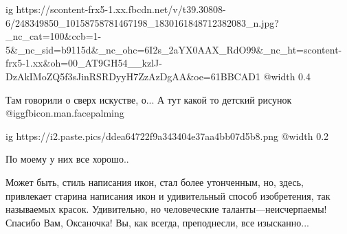  
 
 
 
 

\ifcmt
  ig https://scontent-frx5-1.xx.fbcdn.net/v/t39.30808-6/248349850_10158758781467198_1830161848712382083_n.jpg?_nc_cat=100&ccb=1-5&_nc_sid=b9115d&_nc_ohc=6I2s_2aYX0AAX_RdO99&_nc_ht=scontent-frx5-1.xx&oh=00_AT9GH54__kzlJ-DzAkIMoZQ5f3sJinRSRDyyH7ZzAzDgAA&oe=61BBCAD1
  @width 0.4
\fi


Там говорили о сверх искустве, о... А тут какой то детский рисунок @igg{fbicon.man.facepalming} 


\ifcmt
  ig https://i2.paste.pics/ddea64722f9a343404e37aa4bb07d5b8.png
  @width 0.2
\fi

По моему у них все хорошо..


Может быть, стиль написания икон, стал более утонченным, но, здесь, привлекает
старина написания икон и удивительный способ изобретения, так называемых
красок. Удивительно, но человеческие таланты—неисчерпаемы! Спасибо Вам,
Оксаночка! Вы, как всегда, преподнесли, все изысканно...

